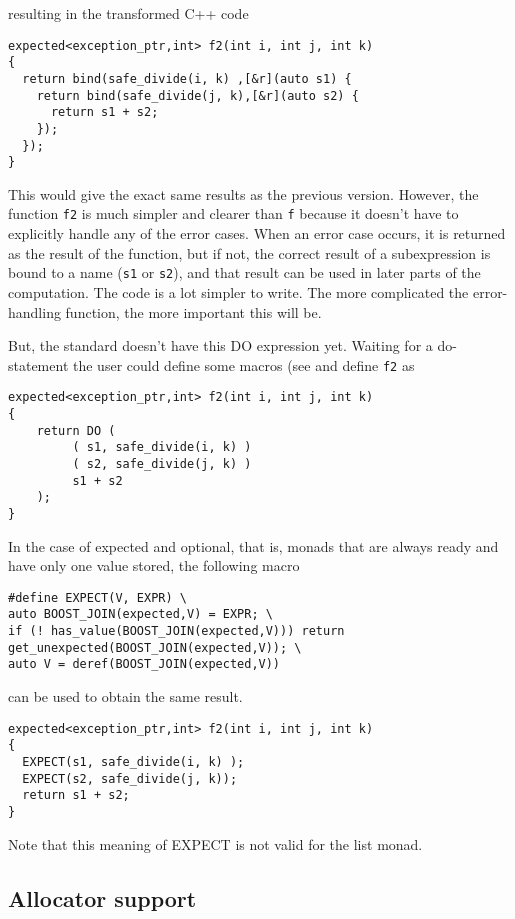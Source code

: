 \documentclass[a4paper,10pt]{article}
\newcommand{\cpp}[1]{\lstinline{#1}}
\begin{document}
resulting in the transformed C++ code

\begin{lstlisting}
expected<exception_ptr,int> f2(int i, int j, int k)
{
  return bind(safe_divide(i, k) ,[&r](auto s1) {
    return bind(safe_divide(j, k),[&r](auto s2) {
      return s1 + s2;
    });
  }); 
}
\end{lstlisting}

This would give the exact same results as the previous version. However, the function \cpp{f2} is much simpler and clearer than \cpp{f} because it doesn't have to explicitly handle any of the error cases. When an error case occurs, it is returned as the result of the function, but if not, the correct result of a subexpression is bound to a name (\cpp{s1} or \cpp{s2}), and that result can be used in later parts of the computation. The code is a lot simpler to write. The more complicated the error-handling function, the more important this will be.

But, the standard doesn't have this DO expression yet.
Waiting for a do-statement the user could define some macros (see \cite{monad_do_poc} and define \cpp{f2} as

\begin{lstlisting}
expected<exception_ptr,int> f2(int i, int j, int k)
{
    return DO (
         ( s1, safe_divide(i, k) )
         ( s2, safe_divide(j, k) )
         s1 + s2 
    );
}
\end{lstlisting}

In the case of expected and optional, that is, monads that are always ready and have only one value stored, the following macro 

\begin{lstlisting}
#define EXPECT(V, EXPR) \
auto BOOST_JOIN(expected,V) = EXPR; \
if (! has_value(BOOST_JOIN(expected,V))) return get_unexpected(BOOST_JOIN(expected,V)); \
auto V = deref(BOOST_JOIN(expected,V))
\end{lstlisting}

can be used to obtain the same result.

\begin{lstlisting}
expected<exception_ptr,int> f2(int i, int j, int k)
{
  EXPECT(s1, safe_divide(i, k) );
  EXPECT(s2, safe_divide(j, k));
  return s1 + s2;
}
\end{lstlisting}

Note that this meaning of EXPECT is not valid for the list monad. 

\subsection{Allocator support}
\end{document}
